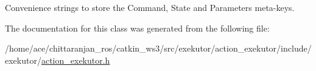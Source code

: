 \-Convenience strings to store the \-Command, \-State and \-Parameters meta-\/keys. 



\-The documentation for this class was generated from the following file\-:\begin{DoxyCompactItemize}
\item 
/home/ace/chittaranjan\-\_\-ros/catkin\-\_\-ws3/src/exekutor/action\-\_\-exekutor/include/exekutor/\hyperlink{action__exekutor_8h}{action\-\_\-exekutor.\-h}\end{DoxyCompactItemize}
